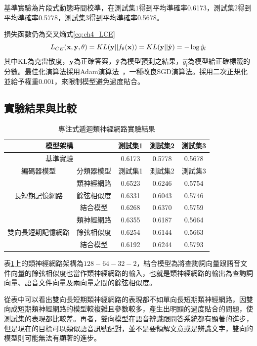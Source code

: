 基準實驗為片段式動態時間校準，在測試集$1$得到平均準確率0.6173，測試集$2$得到平均準確率0.5778，測試集$3$得到平均準確率0.5678。

損失函數仍為交叉熵式\ref{eq:ch4_LCE}
\begin{equation}
\label{eq:ch4_LCE}
L_{CE}(\bold{x}, \bold{y} , \theta) = KL(\bold{y} || f_{\theta}(\bold{x}))= KL( \bold{y} ||\hat{\bold {y}} )  = - \log \hat{y}_{l} 
\end{equation}
其中KL為克雷散度，$\bold{y}$為正確答案，$\hat{\bold{y}}$為模型預測之結果，$\hat{y_l}$為模型給正確標籤的分數。最佳化演算法採用Adam演算法~\cite{kingma2014adam}，一種改良SGD演算法。採用二次正規化並給予權重$0.001$，來限制模型避免過度貼合。
\subsection{實驗結果與比較}
\begin{table}[ht]
	 \centering
	 \caption{專注式遞迴類神經網路實驗結果}
	 \label{table:ch4_att_exp}
	 \begin{tabular}{|c|c|c|c|c|}
		 \hline
		 \multicolumn{2}{|c|}{模型架構} & 測試集1 & 測試集2 & 測試集3 \\
		 \hline
		 \multicolumn{2}{|c|}{基準實驗} & 0.6173 & 0.5778 & 0.5678\\
		 \hline
		 \hline 
		 編碼器模型 & 分類器模型 & 測試集1 &測試集2 & 測試集3 \\
		 \hline
		 \multirow{3}{*}{長短期記憶網路} & 類神經網路 &
		 {\color{red}0.6523} &0.6246 & 0.5754\\
		 \cline{2-5}
		 & 餘弦相似度& 0.6331 & 0.6043 & 0.5746 \\
		 \cline{2-5}
		 & 結合模型 & 0.6268 & 0.6370 & 0.5759 \\ 
		 \hline
		 \multirow{3}{*}{雙向長短期記憶網路} & 類神經網路 &
		 0.6355 & 0.6187 & 0.5664\\
		 \cline{2-5}
		 & 餘弦相似度& 0.6254 & 0.6144&0.5663\\
		 \cline{2-5}
		 & 結合模型 &0.6192&0.6244&0.5793 \\
		 \hline
	   \end{tabular}
\end{table}


表\ref{table:ch4_att_exp}上的類神經網路架構為$128-64-32-2$，結合模型為將查詢詞向量跟語音文件向量的餘弦相似度也當作類神經網路的輸入，也就是類神經網路的輸出為查詢詞向量、語音文件向量及兩向量之間的餘弦相似度。

從表中可以看出雙向長短期類神經網路的表現都不如單向長短期類神經網路，因雙向成短期類神經網路的模型較複雜且參數較多，產生出明顯的過度貼合的問題，使測試集的表現都比較差。再者，雙向模型在語音辨識跟問答系統都有顯著的進步，但是現在的目標可以類似語音訊號配對，並不是要領解文意或是辨識文字，雙向的模型則可能無法有顯著的進步。

